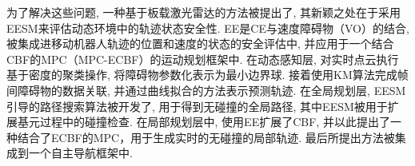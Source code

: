 \documentclass[preprint,5p,times,twocolumn]{elsarticle}
\begin{document}
为了解决这些问题, 一种基于板载激光雷达的方法被提出了, 其新颖之处在于采用EESM来评估动态环境中的轨迹状态安全性.
EE是CE与速度障碍物（VO）的结合, 被集成进移动机器人轨迹的位置和速度的状态的安全评估中, 并应用于一个结合CBF的MPC（MPC-ECBF）的运动规划框架中.
在动态感知层, 对实时点云执行基于密度的聚类操作\citep{Nasibov2009RobustnessOD}, 将障碍物参数化表示为最小边界球. 接着使用KM算法\citep{Kuhn1955TheHM}完成帧间障碍物的数据关联, 并通过曲线拟合的方法表示预测轨迹.
在全局规划层, EESM引导的路径搜索算法被开发了, 用于得到无碰撞的全局路径, 其中EESM被用于扩展基元过程中的碰撞检查.
在局部规划层中, 使用EE扩展了CBF, 并以此提出了一种结合了ECBF的MPC，用于生成实时的无碰撞的局部轨迹.
最后所提出方法被集成到一个自主导航框架中.
\end{document}
